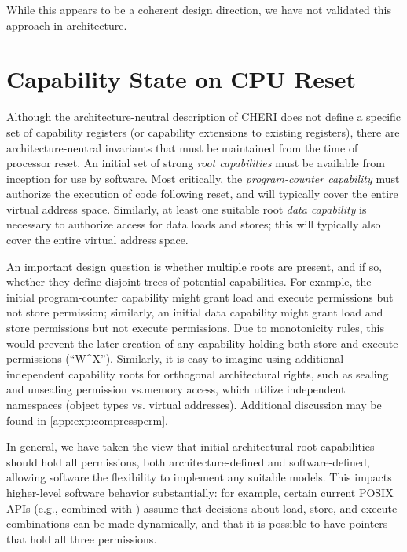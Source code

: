While this appears to be a coherent design direction, we have not validated
this approach in architecture.

\section{Capability State on CPU Reset}
\label{sec:capability-state-on-cpu-reset}

Although the architecture-neutral description of CHERI does not define a
specific set of capability registers (or capability extensions to existing
registers), there are architecture-neutral invariants that must be maintained
from the time of processor reset.
An initial set of strong \textit{root capabilities} must be available from
inception for use by software.
Most critically, the \textit{program-counter capability} must authorize the
execution of code following reset, and will typically cover the entire virtual
address space.
Similarly, at least one suitable root \textit{data capability} is necessary to
authorize access for data loads and stores; this will typically also cover the
entire virtual address space.

An important design question is whether multiple roots are present, and if so,
whether they define disjoint trees of potential capabilities.
For example, the initial program-counter capability might grant load and
execute permissions but not store permission; similarly, an initial data
capability might grant load and store permissions but not execute permissions.
Due to monotonicity rules, this would prevent the later creation of any
capability holding both store and execute permissions (``W\^{}X'').
Similarly, it is easy to imagine using additional independent capability roots
for orthogonal architectural rights, such as sealing and unsealing permission
vs.\@ memory access, which utilize independent namespaces (object types vs.\@
virtual addresses).  Additional discussion may be found in
\cref{app:exp:compressperm}.

In general, we have taken the view that initial architectural root
capabilities should hold all permissions, both architecture-defined and
software-defined, allowing software the flexibility to implement any suitable
models.
This impacts higher-level software behavior substantially: for example,
certain current POSIX APIs (e.g.,  combined with
) assume that decisions about load, store, and execute
combinations can be made dynamically, and that it is possible to have pointers
that hold all three permissions.

